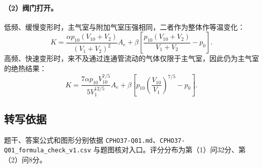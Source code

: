 \paragraph{（2）阀门打开。} 低频、缓慢变形时，主气室与附加气室压强相同，二者作为整体作等温变化：
\[
\boxed{K=\frac{\alpha p_{10}(V_{10}+V_2)}{(V_1+V_2)^2}A_e
+\beta\left[\frac{p_{10}(V_{10}+V_2)}{V_1+V_2}-p_0\right].}
\]
高频、快速变形时，来不及通过连通管流动的气体仅限于主气室，因此仍为主气室的绝热结果：
\[
\boxed{K=\frac{7\alpha p_{10}V_{10}^{7/5}}{5V_1^{12/5}}A_e
+\beta\left[p_{10}\left(\frac{V_{10}}{V_1}\right)^{7/5}-p_0\right].}
\]

\subsection{转写依据}
题干、答案公式和图形分别依据 \texttt{CPHO37-Q01.md}、\texttt{CPHO37-Q01\_formula\_check\_v1.csv} 与题图核对入口。评分分布为第（1）问32分、第（2）问8分。
